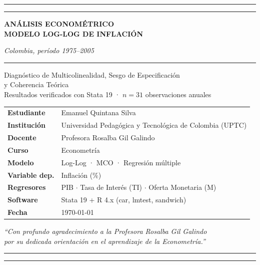 \documentclass[12pt,a4paper]{article}
\begin{document}
\begin{titlepage}\centering
{\color{uptv}\rule{\linewidth}{3pt}}\vspace{2pt}
{\color{oro}\rule{\linewidth}{1.5pt}}
\vspace{1.6cm}

{\fontsize{24}{30}\selectfont\bfseries\color{uptv}
ANÁLISIS ECONOMÉTRICO\\[0.35em]
MODELO LOG-LOG DE INFLACIÓN}

\vspace{0.5cm}
{\large\color{uptv}\itshape Colombia, período 1975--2005}

\vspace{0.6cm}
{\color{oro}\rule{0.6\linewidth}{0.8pt}}
\vspace{0.6cm}

{\large
Diagnóstico de Multicolinealidad, Sesgo de Especificación\\[0.25em]
y Coherencia Teórica}\\[0.3em]
{\normalsize\color{gris_t}
Resultados verificados con Stata 19 ·
$n=31$ observaciones anuales}

\vspace{2cm}
\begin{tabular}{@{\hspace{8mm}}ll@{}}
\toprule
\rule{0pt}{10pt}\textbf{Estudiante}    & Emanuel Quintana Silva\\[3pt]
\textbf{Institución}   & Universidad Pedagógica y Tecnológica de Colombia (UPTC)\\[3pt]
\textbf{Docente}       & Profesora Rosalba Gil Galindo\\[3pt]
\textbf{Curso}         & Econometría\\[3pt]
\textbf{Modelo}        & Log-Log · MCO · Regresión múltiple\\[3pt]
\textbf{Variable dep.} & Inflación (\%)\\[3pt]
\textbf{Regresores}    & PIB $\cdot$ Tasa de Interés (TI) $\cdot$ Oferta Monetaria (M)\\[3pt]
\textbf{Software}      & Stata 19 + R 4.x (car, lmtest, sandwich)\\[3pt]
\textbf{Fecha}         & \today\\
\bottomrule
\end{tabular}

\vspace{0.8cm}
\begin{mdframed}[linecolor=oro,linewidth=1pt,backgroundcolor=oro!5]
\centering\small\itshape
``Con profundo agradecimiento a la Profesora Rosalba Gil Galindo\\
por su dedicada orientación en el aprendizaje de la Econometría.''
\end{mdframed}

\vspace{1.5cm}
{\color{oro}\rule{\linewidth}{1.5pt}}\vspace{2pt}
{\color{uptv}\rule{\linewidth}{3pt}}
\end{titlepage}
\end{document}

